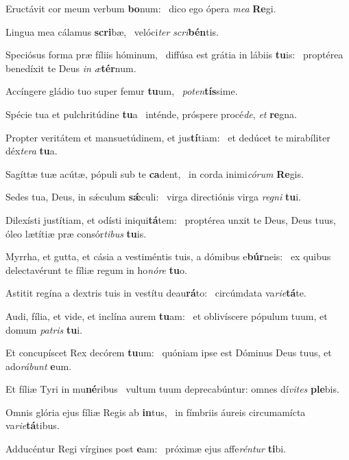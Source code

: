 \item Eructávit cor meum verbum \textbf{bo}num:~\psstar{} dico ego ópera \textit{mea} \textbf{Re}gi.
\item Lingua mea cálamus \textbf{scri}bæ,~\psstar{} velóci\textit{ter} \textit{scri}\textbf{bén}tis.
\item Speciósus forma præ fíliis hóminum,~\pscross{} diffúsa est grátia in lábiis \textbf{tu}is:~\psstar{} proptérea benedíxit te Deus \textit{in} \textit{æ}\textbf{tér}num.
\item Accíngere gládio tuo super femur \textbf{tu}um,~\psstar{} \textit{poten}\textbf{tís}sime.
\item Spécie tua et pulchritúdine \textbf{tu}a~\psstar{} inténde, próspere procé\textit{de}, \textit{et} \textbf{re}gna.
\item Propter veritátem et mansuetúdinem, et jus\textbf{tí}tiam:~\psstar{} et dedúcet te mirabíliter déx\textit{tera} \textbf{tu}a.
\item Sagíttæ tuæ acútæ, pópuli sub te \textbf{ca}dent,~\psstar{} in corda inimi\textit{córum} \textbf{Re}gis.
\item Sedes tua, Deus, in sǽculum \textbf{sǽ}culi:~\psstar{} virga directiónis virga \textit{regni} \textbf{tu}i.
\item Dilexísti justítiam, et odísti iniqui\textbf{tá}tem:~\psstar{} proptérea unxit te Deus, Deus tuus, óleo lætítiæ præ consór\textit{tibus} \textbf{tu}is.
\item Myrrha, et gutta, et cásia a vestiméntis tuis, a dómibus e\textbf{búr}neis:~\psstar{} ex quibus delectavérunt te fíliæ regum in ho\textit{nóre} \textbf{tu}o.
\item Astitit regína a dextris tuis in vestítu deau\textbf{rá}to:~\psstar{} circúmdata va\textit{rie}\textbf{tá}te.
\item Audi, fília, et vide, et inclína aurem \textbf{tu}am:~\psstar{} et oblivíscere pópulum tuum, et domum \textit{patris} \textbf{tu}i.
\item Et concupíscet Rex decórem \textbf{tu}um:~\psstar{} quóniam ipse est Dóminus Deus tuus, et ado\textit{rábunt} \textbf{e}um.
\item Et fíliæ Tyri in mu\textbf{né}ribus~\psstar{} vultum tuum deprecabúntur: omnes dí\textit{vites} \textbf{ple}bis.
\item Omnis glória ejus fíliæ Regis ab \textbf{in}tus,~\psstar{} in fímbriis áureis circumamícta va\textit{rie}\textbf{tá}tibus.
\item Adducéntur Regi vírgines post \textbf{e}am:~\psstar{} próximæ ejus affe\textit{réntur} \textbf{ti}bi.
